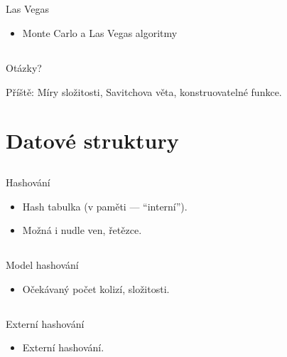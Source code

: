 \documentclass{beamer}
\begin{document}
\subsection{}
\begin{frame}{Las Vegas}
\begin{itemize}
\item Monte Carlo a Las Vegas algoritmy
\end{itemize}
\end{frame}

\subsection{}
\begin{frame}{Otázky?}
\begin{center}
Příště: Míry složitosti, Savitchova věta, konstruovatelné funkce.
\end{center}
\end{frame}

\section{Datové struktury}

\subsection{}
\begin{frame}{Hashování}
\begin{itemize}
\item Hash tabulka (v paměti --- ``interní'').
\item Možná i nudle ven, řetězce.
\end{itemize}
\end{frame}

\subsection{}
\begin{frame}{Model hashování}
\begin{itemize}
\item Očekávaný počet kolizí, složitosti.
\end{itemize}
\end{frame}

\subsection{}
\begin{frame}{Externí hashování}
\begin{itemize}
\item Externí hashování.
\end{itemize}
\end{frame}
\end{document}
